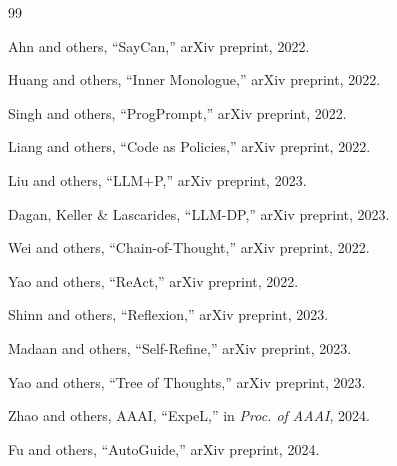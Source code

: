 \documentclass[10pt,twocolumn]{ICCAS}
\begin{document}



\maketitle






%
\begin{thebibliography}{99}
%     
%     

Ahn and others, ``SayCan,'' arXiv preprint, 2022.

Huang and others, ``Inner Monologue,'' arXiv preprint, 2022.

Singh and others, ``ProgPrompt,'' arXiv preprint, 2022.

Liang and others, ``Code as Policies,'' arXiv preprint, 2022.

Liu and others, ``LLM+P,'' arXiv preprint, 2023.

Dagan, Keller \& Lascarides, ``LLM-DP,'' arXiv preprint, 2023.

Wei and others, ``Chain-of-Thought,'' arXiv preprint, 2022.

Yao and others, ``ReAct,'' arXiv preprint, 2022.

Shinn and others, ``Reflexion,'' arXiv preprint, 2023.

Madaan and others, ``Self-Refine,'' arXiv preprint, 2023.

Yao and others, ``Tree of Thoughts,'' arXiv preprint, 2023.

Zhao and others, AAAI, ``ExpeL,'' in \textit{Proc. of AAAI}, 2024.

Fu and others, ``AutoGuide,'' arXiv preprint, 2024.


\end{thebibliography}
\end{document}
